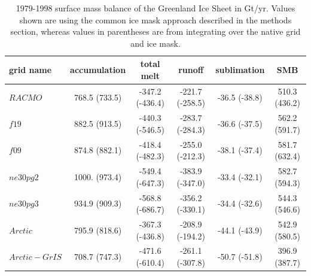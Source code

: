 \documentclass[draft]{agujournal2019}
\begin{document}
 \begin{table}
 \centering
 \scriptsize
 \begin{tabular}{lccccc}
   \hline
   grid name & accumulation & total melt & runoff & sublimation & SMB \\ 
   \hline
   $RACMO$ & 768.5 (733.5) & -347.2 (-436.4) & -221.7 (-258.5) & -36.5 (-38.8) & 510.3 (436.2) \\
   \hline
   $f19$ & 882.5 (913.5) & -440.3 (-546.5) & -283.7 (-284.3) & -36.6 (-37.5) & 562.2 (591.7) \\
   $f09$ & 874.8 (882.1) & -418.4 (-482.3) & -255.0 (-212.3) & -38.1 (-37.4) & 581.7 (632.4) \\
   $ne30pg2$ & 1000. (973.4) & -549.4 (-647.3) & -383.9 (-347.0) & -33.4 (-32.1) & 582.7 (594.3) \\
   $ne30pg3$ & 934.9 (909.3) & -568.8 (-686.7) & -356.2 (-330.1) & -34.4 (-32.6) & 544.3 (546.6) \\
   $Arctic$ & 795.9 (818.6) & -367.3 (-436.8) & -208.9 (-194.2) & -44.1 (-43.9) & 542.9 (580.5) \\
   $Arctic-GrIS$ & 708.7 (747.3) & -471.6 (-610.4) & -261.1 (-307.8) & -50.7 (-51.8) & 396.9 (387.7) \\
 \hline
 \end{tabular}
  \caption{1979-1998 surface mass balance of the Greenland Ice Sheet in Gt/yr. Values shown are using the common ice mask approach described in the methods section, whereas values in parentheses are from integrating over the native grid and ice mask.}
 \label{tbl:table3}
 \end{table}
\end{document}
